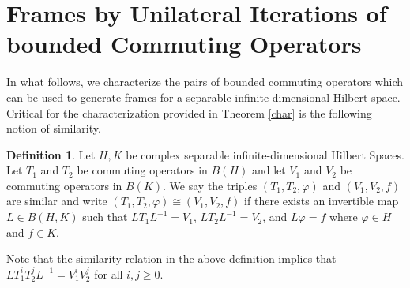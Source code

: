 \documentclass[12pt,reqno]{amsart}
\theoremstyle{definition}
\theoremstyle{definition}
\newtheorem{definition}[theorem]{Definition}
\numberwithin{equation}{section}
\begin{document}
\section{Frames by Unilateral Iterations of bounded Commuting Operators}
In what follows, we characterize the pairs of bounded commuting operators which can be used to generate frames for a separable infinite-dimensional Hilbert space. Critical for the characterization provided in Theorem \ref{char} is the following notion of similarity.
 \begin{definition} \label{similar}
Let $H, K$ be complex separable infinite-dimensional Hilbert Spaces. Let $T_1$ and $ T_2$ be commuting operators  in $B(H)$ and let  $V_1$ and $ V_2$ be commuting operators in $B(K)$. We say the triples $(T_1, T_2, \varphi)$ and $(V_1, V_2, f)$ are similar and write 
\newline
$(T_1, T_2, \varphi) \cong (V_1, V_2, f)$ if there exists an invertible map $L \in B(H, K)$ such that $LT_{1}L^{-1} = V_{1}$, $LT_{2}L^{-1} = V_{2}$, and $L\varphi = f$ where $\varphi \in H$ and $f \in K$.
\end{definition}
Note that the similarity relation in the above definition implies that $LT_{1}^iT_{2}^jL^{-1} = V_{1}^iV_{2}^j$ for all $i, j \geq 0$.



\end{document}
